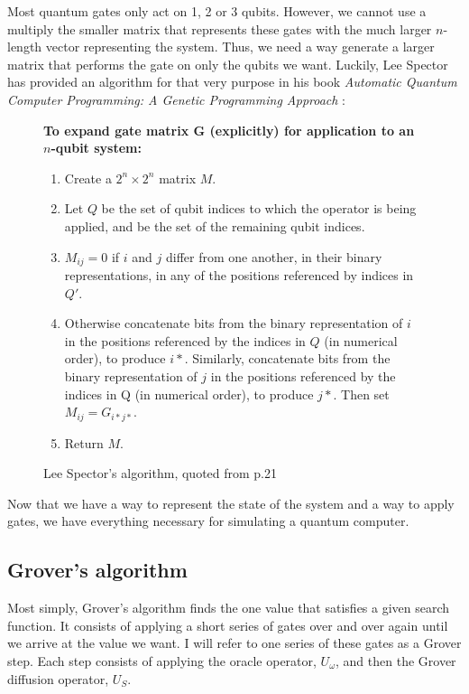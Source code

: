 \documentclass[11pt]{article}
\begin{document}
Most quantum gates only act on 1, 2 or 3 qubits. However, we cannot use a multiply the smaller matrix that represents these gates with the much larger $n$-length vector representing the system. Thus, we need a way generate a larger matrix that performs the gate on only the qubits we want. Luckily, Lee Spector has provided an algorithm for that very purpose in his book \textit{Automatic Quantum Computer Programming: A Genetic Programming Approach} \cite{spector04}:

\begin{figure}[h]
\begin{framed}
\textbf{To expand gate matrix G (explicitly) for application to an $n$-qubit system:}
\begin{enumerate}
\item Create a $2^{n} \times 2^{n}$ matrix $M$.
\item Let $Q$ be the set of qubit indices to which the operator is
being applied, and be the set of the remaining qubit
indices.
\item $M_{ij}=0$ if $i$ and $j$ differ from one another, in their binary representations, in any of the positions referenced by indices in $Q'$.
\item Otherwise concatenate bits from the binary representation of $i$ in the positions referenced by the indices in $Q$ (in numerical order), to produce $i*$. Similarly, concatenate bits from the binary representation of $j$ in the positions referenced by the indices in Q (in numerical order), to
produce $j*$. Then set $M_{ij}=G_{i*j*}$.
\item Return $M$.
\end{enumerate}
\end{framed}
\caption{Lee Spector's algorithm, quoted from p.21}
\end{figure}

Now that we have a way to represent the state of the system and a way to apply gates, we have everything necessary for simulating a quantum computer.

\subsection{Grover's algorithm}

Most simply, Grover's algorithm finds the one value that satisfies a given search function. It consists of applying a short series of gates over and over again until we arrive at the value we want. I will refer to one series of these gates as a Grover step. Each step consists of applying the oracle operator, $U_{\omega}$, and then the Grover diffusion operator, $U_{S}$.
\end{document}
